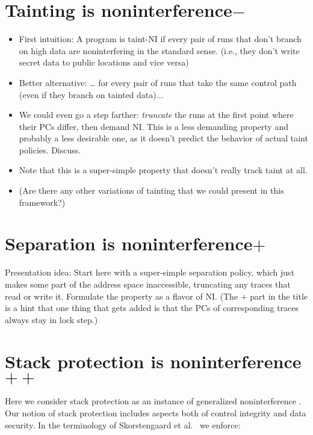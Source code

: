 \documentclass[conference]{IEEEtran}
\begin{document}
\newpage
\section{Tainting is noninterference$-$}


\begin{itemize}
\item First intuition: A program is taint-NI if every pair of runs that don’t
branch on high data are noninterfering in the standard sense.  (i.e., they
don't write secret data to public locations and vice versa)
\item Better alternative: … for every pair of runs that take the same control path (even if they branch on tainted data)...
\item We could even go a step farther: {\em truncate} the runs at the
  first point where their PCs differ, then demand NI.  This is a less
  demanding property and probably a less desirable one, as it doesn't
  predict the behavior of actual taint policies.  Discuss.
\item Note that this is a super-simple property that doesn't really track
taint at all.
\item (Are there any other variations of tainting that we could present in
this framework?)
\end{itemize}


\section{Separation is noninterference$+$}

Presentation idea: Start here with a super-simple separation policy, which
just makes some part of the address space inaccessible, truncating any
traces that read or write it.  Formulate the property as a flavor of NI.
(The $+$ part in the title is a hint that one thing that gets added is that
the PCs of corresponding traces always stay in lock step.)

\section{Stack protection is noninterference$++$}

Here we consider stack protection as an instance of generalized noninterference .
Our notion of stack protection includes aspects both of control integrity and data security.
In the terminology of Skorstengaard et al.~\cite{Skorstengaard+19} we enforce:
\end{document}

